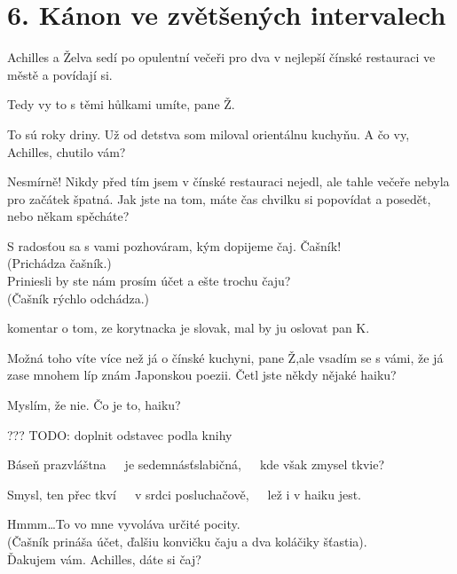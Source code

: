\documentclass[12pt]{article}
\begin{document}
\section*{6. Kánon ve zvětšených intervalech}
Achilles a Želva sedí po opulentní večeři pro dva v nejlepší čínské restauraci 
    ve městě a povídají si.
\begin{description}[itemsep=0pt]
\item[A:] Tedy vy to s těmi hůlkami umíte, pane Ž.

\item[Ž:] To sú roky driny. Už od detstva som miloval orientálnu kuchyňu. 
    A čo vy, Achilles, chutilo vám?

\item[A:] Nesmírně! Nikdy před tím jsem v čínské restauraci nejedl, ale
    tahle večeře nebyla pro začátek špatná. Jak jste na tom, máte čas chvilku
    si popovídat a posedět, nebo někam spěcháte?

\item[Ž:] S radosťou sa s vami pozhováram, kým dopijeme čaj. Čašník!\\
    (Prichádza čašník.)\\
    Priniesli by ste nám prosím účet a ešte trochu čaju?\\
    (Čašník rýchlo odchádza.)

\item[TODO] komentar o tom, ze korytnacka je slovak, mal by ju oslovat pan K.

\item[A:] Možná toho víte více než já o čínské kuchyni, pane Ž,ale vsadím
    se s vámi, že já zase mnohem líp znám Japonskou poezii. Četl jste někdy
    nějaké haiku?

\item[Ž:] Myslím, že nie. Čo je to, haiku?

\item[A:] ??? TODO: doplnit odstavec podla knihy

\item[Ž:] Báseň prazvláštna\ \ \ je sedemnásťslabičná,\ \ \ kde však zmysel tkvie?

\item[A:] Smysl, ten přec tkví\ \ \ v srdci posluchačově,\ \ \ lež i v haiku jest.

\item[Ž:] Hmmm\dots To vo mne vyvoláva určité pocity.\\
    (Čašník prináša účet, ďalšiu konvičku čaju a dva koláčiky šťastia).\\
    Ďakujem vám. Achilles, dáte si čaj?


\end{description}
\end{document}
